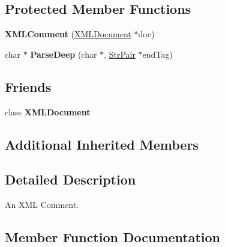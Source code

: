 \subsection*{Protected Member Functions}
\begin{DoxyCompactItemize}
\item 
\hypertarget{classtinyxml2_1_1_x_m_l_comment_ae6463adc3edd93a8e5a9b2b7e99cdf91}{}{\bfseries X\+M\+L\+Comment} (\hyperlink{classtinyxml2_1_1_x_m_l_document}{X\+M\+L\+Document} $\ast$doc)\label{classtinyxml2_1_1_x_m_l_comment_ae6463adc3edd93a8e5a9b2b7e99cdf91}

\item 
\hypertarget{classtinyxml2_1_1_x_m_l_comment_aa6ab35c3bb1c1840371dc32a2040c57f}{}char $\ast$ {\bfseries Parse\+Deep} (char $\ast$, \hyperlink{classtinyxml2_1_1_str_pair}{Str\+Pair} $\ast$end\+Tag)\label{classtinyxml2_1_1_x_m_l_comment_aa6ab35c3bb1c1840371dc32a2040c57f}

\end{DoxyCompactItemize}
\subsection*{Friends}
\begin{DoxyCompactItemize}
\item 
\hypertarget{classtinyxml2_1_1_x_m_l_comment_a4eee3bda60c60a30e4e8cd4ea91c4c6e}{}class {\bfseries X\+M\+L\+Document}\label{classtinyxml2_1_1_x_m_l_comment_a4eee3bda60c60a30e4e8cd4ea91c4c6e}

\end{DoxyCompactItemize}
\subsection*{Additional Inherited Members}


\subsection{Detailed Description}
An X\+M\+L Comment. 

\subsection{Member Function Documentation}
\hypertarget{classtinyxml2_1_1_x_m_l_comment_aa382b1be6a8b0650c16a2d88bb499335}{}
